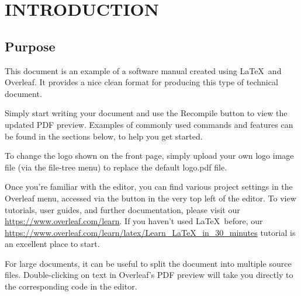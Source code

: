 \chapter{INTRODUCTION}

\section{Purpose}

This document is an example of a software manual created using \LaTeX\ and Overleaf. It provides a nice clean format for producing this type of technical document. 

Simply start writing your document and use the Recompile button to view the updated PDF preview. Examples of commonly used commands and features can be found in the sections below, to help you get started.

To change the logo shown on the front page, simply upload your own logo image file (via the file-tree menu) to replace the default logo.pdf file. 

Once you're familiar with the editor, you can find various project settings in the Overleaf menu, accessed via the button in the very top left of the editor. To view tutorials, user guides, and further documentation, please visit our \url{https://www.overleaf.com/learn}. If you haven't used \LaTeX\ before, our \url{https://www.overleaf.com/learn/latex/Learn_LaTeX_in_30_minutes} tutorial is an excellent place to start.

For large documents, it can be useful to split the document into multiple source files.
Double-clicking on text in Overleaf's PDF preview will take you directly to the corresponding code in the editor.
